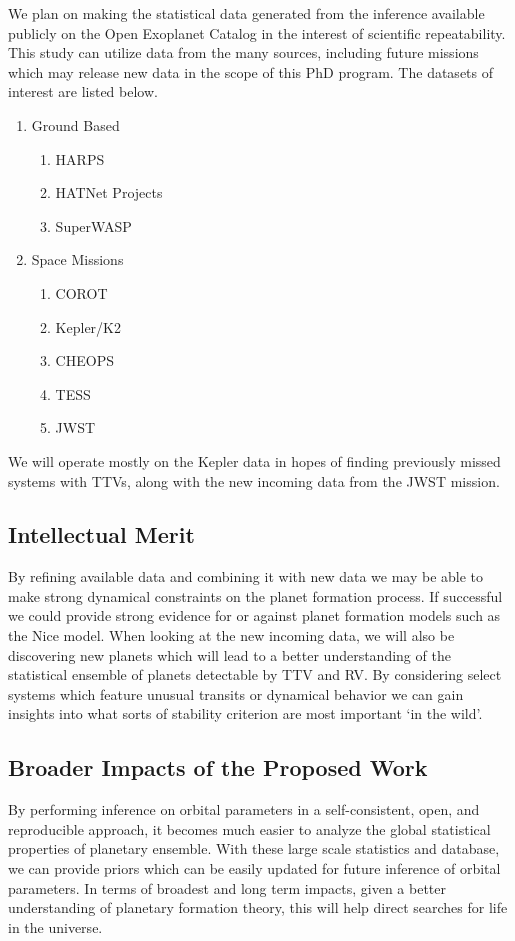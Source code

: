 We plan on making the statistical data generated from the inference available publicly on the Open Exoplanet Catalog in the interest of scientific repeatability.
This study can utilize data from the many sources, including future missions which may release new data in the scope of this PhD program. 
The datasets of interest are listed below.
\begin{enumerate}
      \item Ground Based
		\begin{enumerate}
      		\item HARPS
      		\item HATNet Projects
      		\item SuperWASP
      		\end{enumerate}
      \item Space Missions
      		\begin{enumerate}
            	\item COROT
      		\item Kepler/K2
           	\item CHEOPS
      		\item TESS
           	 \item JWST
      		\end{enumerate}
 \end{enumerate}
We will operate mostly on the Kepler data in hopes of finding previously missed systems with TTVs, along with the new incoming data from the JWST mission.

\subsection{Intellectual Merit} 
By refining available data and combining it with new data we may be able to make strong dynamical constraints on the planet formation process. 
If successful we could provide strong evidence for or against planet formation models such as the Nice model.
When looking at the new incoming data, we will also be discovering new planets which will lead to a better understanding of the statistical ensemble of planets detectable by TTV and RV.
By considering select systems which feature unusual transits or dynamical behavior we can gain insights into what sorts of stability criterion are most important `in the wild'.

\subsection{Broader Impacts of the Proposed Work} 
By performing inference on orbital parameters in a self-consistent, open, and reproducible approach, it becomes much easier to analyze the global statistical properties of planetary ensemble.
With these large scale statistics and database, we can provide priors which can be easily updated for future inference of orbital parameters.
In terms of broadest and long term impacts, given a better understanding of planetary formation theory, this will help direct searches for life in the universe.





